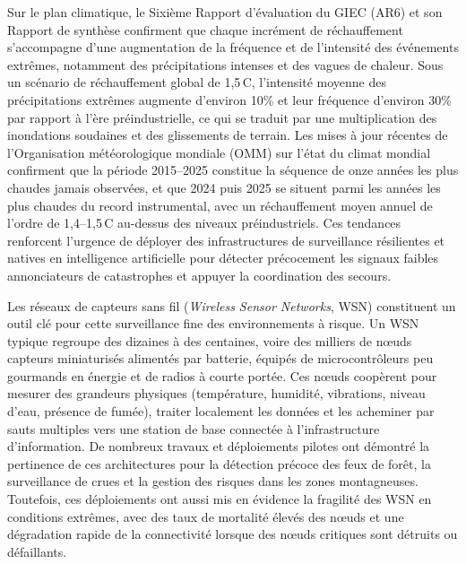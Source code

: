 Sur le plan climatique, le Sixième Rapport d'évaluation du GIEC (AR6) et son Rapport de synthèse confirment que chaque incrément de réchauffement s'accompagne d'une augmentation de la fréquence et de l'intensité des événements extrêmes, notamment des précipitations intenses et des vagues de chaleur\cite{IPCC2021AR6}. Sous un scénario de réchauffement global de 1{,}5\,\textdegree C, l'intensité moyenne des précipitations extrêmes augmente d'environ 10\% et leur fréquence d'environ 30\% par rapport à l'ère préindustrielle, ce qui se traduit par une multiplication des inondations soudaines et des glissements de terrain\cite{IPCC2021AR6}. Les mises à jour récentes de l'Organisation météorologique mondiale (OMM) sur l'état du climat mondial confirment que la période 2015--2025 constitue la séquence de onze années les plus chaudes jamais observées, et que 2024 puis 2025 se situent parmi les années les plus chaudes du record instrumental, avec un réchauffement moyen annuel de l'ordre de 1{,}4--1{,}5\,\textdegree C au-dessus des niveaux préindustriels\cite{wmo2025climate}. Ces tendances renforcent l'urgence de déployer des infrastructures de surveillance résilientes et natives en intelligence artificielle pour détecter précocement les signaux faibles annonciateurs de catastrophes et appuyer la coordination des secours.

Les réseaux de capteurs sans fil (\emph{Wireless Sensor Networks}, WSN) constituent un outil clé pour cette surveillance fine des environnements à risque\cite{al_qundus_wireless_2020,yarali_wireless_2020}. Un WSN typique regroupe des dizaines à des centaines, voire des milliers de nœuds capteurs miniaturisés alimentés par batterie, équipés de microcontrôleurs peu gourmands en énergie et de radios à courte portée. Ces nœuds coopèrent pour mesurer des grandeurs physiques (température, humidité, vibrations, niveau d'eau, présence de fumée), traiter localement les données et les acheminer par sauts multiples vers une station de base connectée à l'infrastructure d'information\cite{chong2003sensor,erdelj2017disaster}. De nombreux travaux et déploiements pilotes ont démontré la pertinence de ces architectures pour la détection précoce des feux de forêt, la surveillance de crues et la gestion des risques dans les zones montagneuses\cite{Aslan2012ForestFireWSN,biabani_energy-efficient_2020,dampage_forest_2022-1}. Toutefois, ces déploiements ont aussi mis en évidence la fragilité des WSN en conditions extrêmes, avec des taux de mortalité élevés des nœuds et une dégradation rapide de la connectivité lorsque des nœuds critiques sont détruits ou défaillants\cite{AbuGhazaleh2007WSNSurvivability,erdelj2017disaster}.

